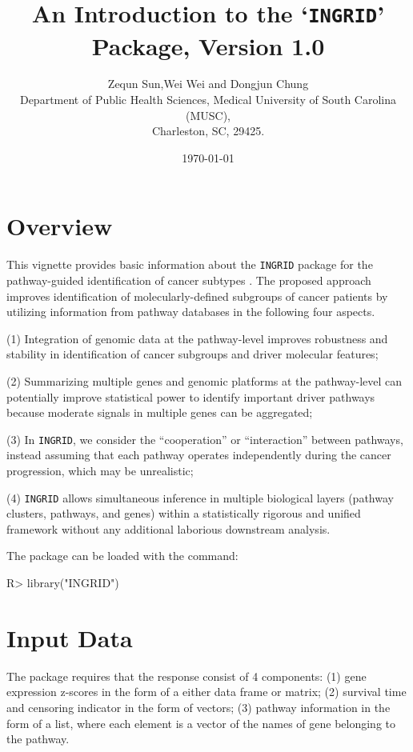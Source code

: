 \documentclass[11pt]{article}
\title{An Introduction to the `\texttt{INGRID}' Package, Version 1.0}
\author{Zequn Sun,Wei Wei and Dongjun Chung\\
Department of Public Health Sciences, Medical University of South Carolina (MUSC),\\
  Charleston, SC, 29425.}
\date{\today}
\begin{document}

\maketitle

\section{Overview}

This vignette provides basic information about the
\texttt{INGRID} package for the pathway-guided identification of cancer subtypes \cite{INGRID}. The proposed approach improves identification of molecularly-defined subgroups of cancer patients by utilizing information from pathway databases in the following four aspects.

(1) Integration of genomic data at the pathway-level improves robustness and stability in identification of cancer subgroups and driver molecular features;

(2) Summarizing multiple genes and genomic platforms at the pathway-level can potentially improve statistical power to identify important driver pathways because moderate signals in multiple genes can be aggregated;

(3) In \texttt{INGRID}, we consider the ``cooperation'' or ``interaction'' between pathways, instead assuming that each pathway operates independently during the cancer progression, which may be unrealistic;

(4) \texttt{INGRID} allows simultaneous inference in multiple biological layers (pathway clusters, pathways, and genes) within a statistically rigorous and unified framework without any additional laborious downstream analysis.

The package can be loaded with the command:


\begin{Schunk}
\begin{Sinput}
R> library("INGRID")
\end{Sinput}
\end{Schunk}

\section{Input Data}

The package requires that the response consist of 4 components:
(1) gene expression z-scores in the form of a either data frame or matrix;
(2) survival time and censoring indicator in the form of vectors;
(3) pathway information in the form of a list, where each element is a vector of the names of gene belonging to the pathway.
\end{document}
